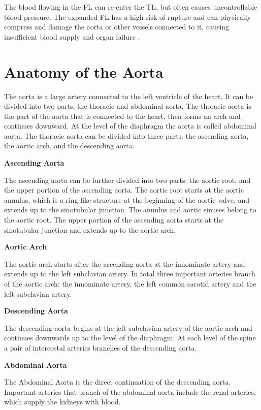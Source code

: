 \documentclass[thesis.tex]{subfiles}
\begin{document}
The blood flowing in the FL can re-enter the TL, but often causes uncontrollable blood pressure. The expanded FL has a high risk of rupture and can physically compress \cite{criado2011aortic} and damage the aorta or other vessels connected to it, causing insufficient blood supply and organ failure \cite{meszaros2000epidemiology,desanctis1987aortic}. 

\section{Anatomy of the Aorta}

The aorta is a large artery connected to the left ventricle of the heart. It can be divided into two parts, the thoracic and abdominal aorta. The thoracic aorta is the part of the aorta that is connected to the heart, then forms an arch and continues downward. At the level of the diaphragm the aorta is called abdominal aorta. The thoracic aorta can be divided into three parts: the ascending aorta, the aortic arch, and the descending aorta.

\textbf{Ascending Aorta}

The ascending aorta can be further divided into two parts: the aortic root, and the upper portion of the ascending aorta. 
The aortic root starts at the aortic annulus, which is a ring-like structure at the beginning of the aortic valve, and extends up to the sinotubular junction. The annulus and aortic sinuses belong to the aortic root. The upper portion of the ascending aorta starts at the sinotubular junction and extends up to the aortic arch.

\textbf{Aortic Arch}

The aortic arch starts after the ascending aorta at the innominate artery and extends up to the left subclavian artery. In total three important arteries branch of the aortic arch: the innominate artery, the left common carotid artery and the left subclavian artery. 

\textbf{Descending Aorta}

The descending aorta begins at the  left subclavian artery of the aortic arch and continues downwards up to the level of the diaphragm. At each level of the spine a pair of intercostal arteries branches of the descending aorta.

\textbf{Abdominal Aorta}

The Abdominal Aorta is the direct continuation of the descending aorta. Important arteries that branch of the abdominal aorta include the renal arteries, which supply the kidneys with blood.  
\end{document}
